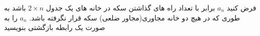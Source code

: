 \exercise
فرض کنید 
$a_n$
 برابر با تعداد راه های گذاشتن سکه در خانه های یک جدول
$2 \times n$
 باشد به طوری که در
هیچ دو خانه مجاوری(مجاور ضلعی) سکه قرار نگرفته باشد.
$a_n$
 را به صورت یک رابطه بازگشتی بنویسید